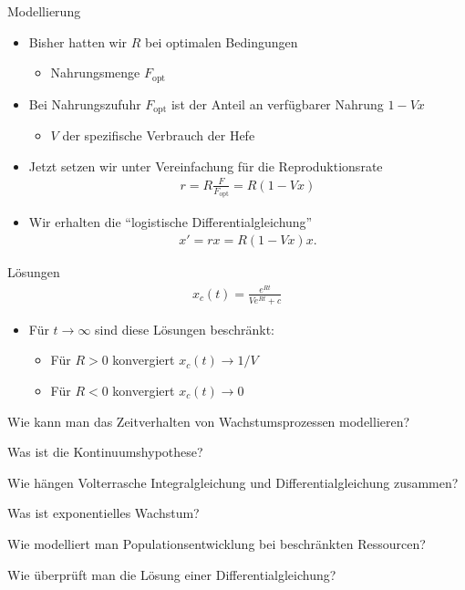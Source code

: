 \begin{frame}{Modellierung}
  \begin{itemize}
  \item Bisher hatten wir $R$ bei optimalen Bedingungen
    \begin{itemize}
    \item Nahrungsmenge $F_{\text{opt}}$
    \end{itemize}
  \item Bei Nahrungszufuhr $F_{\text{opt}}$ ist der Anteil an verfügbarer Nahrung $1-Vx$
    \begin{itemize}
    \item $V$ der spezifische Verbrauch der Hefe
    \end{itemize}
  \item Jetzt setzen wir unter Vereinfachung für die Reproduktionsrate
    \begin{gather*}
      r = R \frac{F}{F_{\text{opt}}} = R (1-Vx)
    \end{gather*}
  \item Wir erhalten die ``logistische Differentialgleichung''
    \begin{gather*}
      x' = rx = R (1-Vx) x.
    \end{gather*}
  \end{itemize}
\end{frame}

\begin{frame}
  \begin{block}{Lösungen}
    \begin{gather*}
      x_c(t) = \frac{e^{Rt}}{V e^{Rt}+c}
    \end{gather*}
  \end{block}
  \pause
  \begin{itemize}
  \item Für $t\to\infty$ sind diese Lösungen beschränkt:
    \begin{itemize}
    \item Für $R>0$ konvergiert $x_c(t) \to 1/V$
    \item Für $R<0$ konvergiert $x_c(t) \to 0$
    \end{itemize}
  \end{itemize}
\end{frame}


\begin{Abschluss}
\item Wie kann man das Zeitverhalten von Wachstumsprozessen modellieren?
\item Was ist die Kontinuumshypothese?
\item Wie hängen Volterrasche Integralgleichung und Differentialgleichung zusammen?
\item Was ist exponentielles Wachstum?
\item Wie modelliert man Populationsentwicklung bei beschränkten Ressourcen?
\item Wie überprüft man die Lösung einer Differentialgleichung?
\end{Abschluss} 

